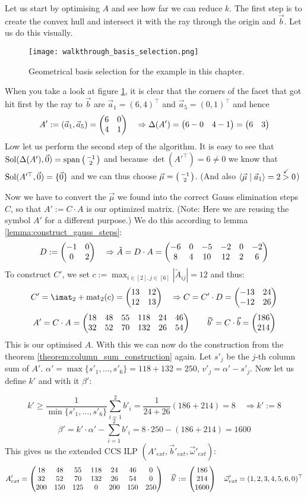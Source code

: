 Let us start by optimising $A$ and see how far we can reduce $k$. The first step is to create the convex hull and intersect it with the ray through the origin and $\vec b$. Let us do this visually.
\begin{figure}
    \centering
    \texttt{[image: walkthrough\_basis\_selection.png]}
    \caption{\label{fig:walkthrough_basis_selection} Geometrical basis selection for the example in this chapter.}
\end{figure}
When you take a look at figure \ref{fig:walkthrough_basis_selection}, it is clear that the corners of the facet that got hit first by the ray to $\vec b$ are $\vec a_1 = (6, 4)^\top$ and $\vec a_5 = (0, 1)^\top$ and hence
$$A' := (\vec a_1, \vec a_5) = \left(\begin{matrix}6&0\\4&1\end{matrix}\right) \quad \Rightarrow \Delta(A') = \left(\begin{matrix}6-0&4-1\end{matrix}\right) = \left(\begin{matrix}6&3\end{matrix}\right)$$
Low let us perform the second step of the algorithm. It is easy to see that $\operatorname{Sol}(\Delta(A'), \vec 0) = \operatorname{span}\left(\begin{smallmatrix}-1\\2\end{smallmatrix}\right)$ and because $\det (A'^\top) = 6 \neq 0$ we know that $\operatorname{Sol}(A'^\top, \vec 0) = \{\vec 0\}$ and we can thus choose $\vec\mu = \left(\begin{smallmatrix}-1\\2\end{smallmatrix}\right)$. (And also $\langle \vec\mu \mid \vec a_1 \rangle = 2 \stackrel{\checkmark}{>} 0$)

Now we have to convert the $\vec\mu$ we found into the correct Gauss elimination steps $C$, so that $A' := C\cdot A$ is our optimized matrix. (Note: Here we are reusing the symbol $A'$ for a different purpose.) We do this according to lemma \ref{lemma:construct_gauss_steps}:
$$D := \left(\begin{matrix}-1&0\\0&2\end{matrix}\right) \quad\Rightarrow \tilde A = D \cdot A = \left(\begin{matrix}-6&0&-5&-2&0&-2\\8&4&10&12&2&6\end{matrix}\right)$$
To construct $C'$, we set $c := \max_{i\in[2], j\in[6]}|\tilde A_{ij}| = 12$ and thus:
$$C' = \imat_2 + \opmat_2(c) = \mat{13&12\\12&13} \quad\Rightarrow C = C'\cdot D = \mat{-13&24\\-12&26}$$
$$A' = C \cdot A = \left(\begin{matrix}18&48&55&118&24&46\\32&52&70&132&26&54\end{matrix}\right)\qquad \vec b' = C\cdot \vec b = \left(\begin{matrix}186\\214\end{matrix}\right)$$
This is our optimised $A$. With this we can now do the construction from the theorem \ref{theorem:column_sum_construction} again. Let $s'_j$ be the $j$-th column sum of $A'$. $\alpha' = \max\{s'_1, \dots, s'_6\} = 118+132=250$, $v'_j = \alpha' - s'_j$. Now let us define $k'$ and with it $\beta'$:

$$k' \geq \frac{1}{\min\{s'_1, \dots, s'_6\}} \sum_{i=1}^{2}b'_i = \frac{1}{24+26}(186+214) = 8 \quad \Rightarrow k' := 8$$ 
$$\beta' = k'\cdot\alpha' - \sum_{i=1}^{2}b'_i = 8\cdot250-(186+214) = 1600$$
This gives us the extended CCS ILP $(A'_{ext}, \vec b'_{ext}, \vec\omega'_{ext})$:
$$A'_{ext} = \left(\begin{matrix}18&48&55&118&24&46&0\\32&52&70&132&26&54&0\\200&150&125&0&200&150&250\end{matrix}\right)\quad\vec b':= \left(\begin{matrix}186\\214\\1600\end{matrix}\right)\quad \vec\omega'_{ext} = (1, 2, 3, 4, 5, 6, 0)^\top$$

